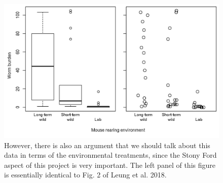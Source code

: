 \documentclass[12pt,reqno,final,pdftex]{amsart}\usepackage[]{graphicx}\usepackage[]{color}
\newenvironment{knitrout}{}{} %
\theoremstyle{plain}
\numberwithin{equation}{part}
\begin{document}
\begin{knitrout}\scriptsize
{}\color{fgcolor}\begin{figure}

\includegraphics[width=\linewidth]{figure/unnamed-chunk-3-1} \hfill{}

\caption[However, there is also an argument that we should talk about this data in terms of the environmental treatments, since the Stony Ford aspect of this project is very important]{However, there is also an argument that we should talk about this data in terms of the environmental treatments, since the Stony Ford aspect of this project is very important. The left panel of this figure is essentially identical to Fig. 2 of Leung et al. 2018.}\label{fig:unnamed-chunk-3}
\end{figure}


\end{knitrout}

\newpage
\end{document}

